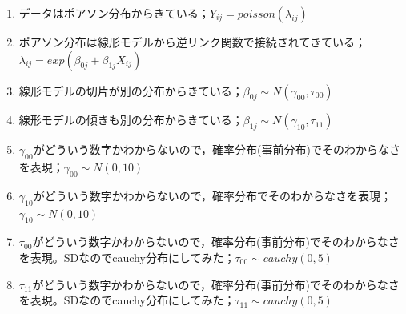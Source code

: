 \begin{enumerate}
	\item データはポアソン分布からきている；$Y_{ij} = poisson(\lambda_{ij})$
	\item ポアソン分布は線形モデルから逆リンク関数で接続されてきている；$\lambda_{ij} = exp(\beta_{0j}+\beta_{1j}X_{ij})$
	\item 線形モデルの切片が別の分布からきている；$\beta_{0j}\sim N(\gamma_{00},\tau_{00})$
	\item 線形モデルの傾きも別の分布からきている；$\beta_{1j}\sim N(\gamma_{10},\tau_{11})$
	\item $\gamma_{00}$がどういう数字かわからないので，確率分布(事前分布)でそのわからなさを表現；$\gamma_{00} \sim N(0,10)$
	\item $\gamma_{10}$がどういう数字かわからないので，確率分布でそのわからなさを表現；$\gamma_{10} \sim N(0,10)$
	\item $\tau_{00}$がどういう数字かわからないので，確率分布(事前分布)でそのわからなさを表現。SDなのでcauchy分布にしてみた；$\tau_{00} \sim cauchy(0,5)$
	\item $\tau_{11}$がどういう数字かわからないので，確率分布(事前分布)でそのわからなさを表現。SDなのでcauchy分布にしてみた；$\tau_{11} \sim cauchy(0,5)$
\end{enumerate}
